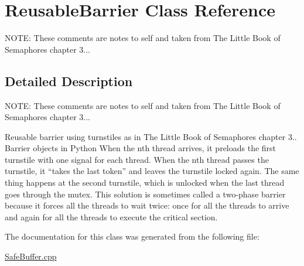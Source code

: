 \hypertarget{class_reusable_barrier}{}\section{Reusable\+Barrier Class Reference}
\label{class_reusable_barrier}


N\+O\+TE\+: These comments are notes to self and taken from The Little Book of Semaphores chapter 3...  




\subsection{Detailed Description}
N\+O\+TE\+: These comments are notes to self and taken from The Little Book of Semaphores chapter 3... 

Reusable barrier using turnstiles as in The Little Book of Semaphores chapter 3.. Barrier objects in Python When the nth thread arrives, it preloads the first turnstile with one signal for each thread. When the nth thread passes the turnstile, it “takes the last token” and leaves the turnstile locked again. The same thing happens at the second turnstile, which is unlocked when the last thread goes through the mutex. This solution is sometimes called a two-\/phase barrier because it forces all the threads to wait twice\+: once for all the threads to arrive and again for all the threads to execute the critical section. 

The documentation for this class was generated from the following file\+:\begin{DoxyCompactItemize}
\item 
\mbox{\hyperlink{_safe_buffer_8cpp}{Safe\+Buffer.\+cpp}}\end{DoxyCompactItemize}
